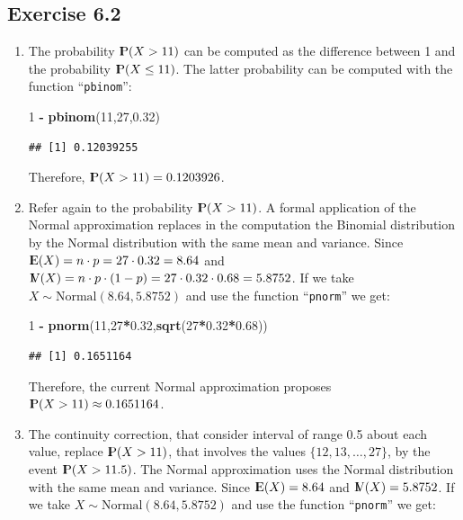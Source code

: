 \documentclass[]{krantz}
\makeatletter
\newenvironment{Shaded}{\begin{snugshade}}{\end{snugshade}}
\newcommand{\KeywordTok}[1]{\textcolor[rgb]{0.13,0.29,0.53}{\textbf{#1}}}
\newcommand{\DecValTok}[1]{\textcolor[rgb]{0.00,0.00,0.81}{#1}}
\newcommand{\FloatTok}[1]{\textcolor[rgb]{0.00,0.00,0.81}{#1}}
\newcommand{\StringTok}[1]{\textcolor[rgb]{0.31,0.60,0.02}{#1}}
\newcommand{\OperatorTok}[1]{\textcolor[rgb]{0.81,0.36,0.00}{\textbf{#1}}}
\newcommand{\NormalTok}[1]{#1}
\newcommand{\Expec}{{\rm I\kern-.3em E}}
\newcommand{\Prob}{{\rm I\kern-.3em P}}
\newcommand{\Var}{{\rm I\kern-.3em V}}
\newenvironment{kframe}{%
\medskip{}
\setlength{\fboxsep}{.8em}
 \def\at@end@of@kframe{}%
 \ifinner\ifhmode%
  \def\at@end@of@kframe{\end{minipage}}%
  \begin{minipage}{\columnwidth}%
 \fi\fi%
 \def\FrameCommand##1{\hskip\@totalleftmargin \hskip-\fboxsep
 \colorbox{shadecolor}{##1}\hskip-\fboxsep
     \hskip-\linewidth \hskip-\@totalleftmargin \hskip\columnwidth}%
 \MakeFramed {\advance\hsize-\width
   \@totalleftmargin\z@ \linewidth\hsize
   \@setminipage}}%
 {\par\unskip\endMakeFramed%
 \at@end@of@kframe}
\renewenvironment{Shaded}{\begin{kframe}}{\end{kframe}}
\theoremstyle{definition}
\theoremstyle{definition}
\theoremstyle{definition}
\theoremstyle{remark}
\makeatother
\begin{document}
\subsection*{Exercise 6.2}\label{exercise-6.2}


\begin{enumerate}
\def\labelenumi{\arabic{enumi}.}
\item
  The probability \(\Prob(X > 11)\) can be computed as the difference
  between 1 and the probability \(\Prob(X \leq 11)\). The latter
  probability can be computed with the function ``\texttt{pbinom}'':

\begin{Shaded}
\begin{Highlighting}[]
\DecValTok{1} \OperatorTok{-}\StringTok{ }\KeywordTok{pbinom}\NormalTok{(}\DecValTok{11}\NormalTok{,}\DecValTok{27}\NormalTok{,}\FloatTok{0.32}\NormalTok{)}
\end{Highlighting}
\end{Shaded}

\begin{verbatim}
## [1] 0.12039255
\end{verbatim}

  Therefore, \(\Prob(X > 11) = 0.1203926\).
\item
  Refer again to the probability \(\Prob(X > 11)\). A formal application
  of the Normal approximation replaces in the computation the Binomial
  distribution by the Normal distribution with the same mean and
  variance. Since \(\Expec(X) = n \cdot p = 27 \cdot 0.32 = 8.64\) and
  \(\Var(X) = n \cdot p \cdot (1-p) = 27 \cdot 0.32 \cdot 0.68 = 5.8752\).
  If we take \(X \sim \mbox{Normal}(8.64,5.8752)\) and use the function
  ``\texttt{pnorm}'' we get:

\begin{Shaded}
\begin{Highlighting}[]
\DecValTok{1} \OperatorTok{-}\StringTok{ }\KeywordTok{pnorm}\NormalTok{(}\DecValTok{11}\NormalTok{,}\DecValTok{27}\OperatorTok{*}\FloatTok{0.32}\NormalTok{,}\KeywordTok{sqrt}\NormalTok{(}\DecValTok{27}\OperatorTok{*}\FloatTok{0.32}\OperatorTok{*}\FloatTok{0.68}\NormalTok{))}
\end{Highlighting}
\end{Shaded}

\begin{verbatim}
## [1] 0.1651164
\end{verbatim}

  Therefore, the current Normal approximation proposes
  \(\Prob(X > 11) \approx 0.1651164\).
\item
  The continuity correction, that consider interval of range 0.5 about
  each value, replace \(\Prob(X > 11)\), that involves the values
  \(\{12, 13, \ldots, 27\}\), by the event \(\Prob(X > 11.5)\). The
  Normal approximation uses the Normal distribution with the same mean
  and variance. Since \(\Expec(X) = 8.64\) and \(\Var(X) = 5.8752\). If
  we take \(X \sim \mbox{Normal}(8.64,5.8752)\) and use the function
  ``\texttt{pnorm}'' we get:


\end{enumerate}
\end{document}
